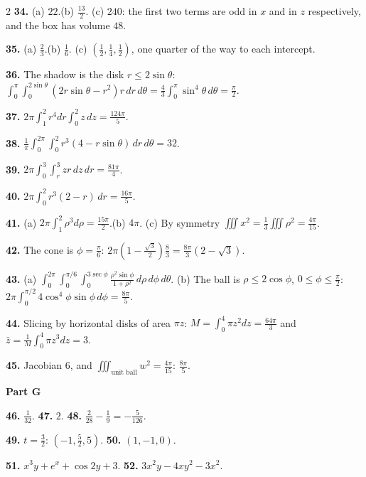 \documentclass[11pt,oneside]{article}
\begin{document}
{\begin{multicols}{2}
\textbf{34.} (a) $22$.\quad (b) $\tfrac{13}{2}$.\quad
(c) $240$: the first two terms are odd in $x$ and in $z$ respectively, and the box has volume $48$.

\textbf{35.} (a) $\tfrac23$.\quad (b) $\tfrac16$.\quad
(c) $\left(\tfrac12,\tfrac14,\tfrac12\right)$, one quarter of the way to each intercept.

\textbf{36.} The shadow is the disk $r\le2\sin\theta$:
$\int_0^{\pi}\!\int_0^{2\sin\theta}\left(2r\sin\theta-r^{2}\right)r\,dr\,d\theta
=\tfrac43\int_0^{\pi}\sin^{4}\theta\,d\theta=\tfrac{\pi}{2}$.

\textbf{37.} $2\pi\int_1^2r^{4}dr\int_0^2z\,dz=\tfrac{124\pi}{5}$.

\textbf{38.} $\tfrac1\pi\int_0^{2\pi}\!\int_0^2r^{3}(4-r\sin\theta)\,dr\,d\theta=32$.

\textbf{39.} $2\pi\int_0^3\!\int_r^3zr\,dz\,dr=\tfrac{81\pi}{4}$.

\textbf{40.} $2\pi\int_0^2r^{3}(2-r)\,dr=\tfrac{16\pi}{5}$.

\textbf{41.} (a) $2\pi\int_1^2\rho^{3}d\rho=\tfrac{15\pi}{2}$.\quad (b) $4\pi$.\quad
(c) By symmetry $\iiint x^{2}=\tfrac13\iiint\rho^{2}=\tfrac{4\pi}{15}$.

\textbf{42.} The cone is $\phi=\tfrac{\pi}{6}$:
$2\pi\left(1-\tfrac{\sqrt3}{2}\right)\tfrac83=\tfrac{8\pi}{3}\left(2-\sqrt3\right)$.

\textbf{43.} (a) $\displaystyle\int_0^{2\pi}\!\!\int_0^{\pi/6}\!\!\int_0^{3\sec\phi}
\frac{\rho^{2}\sin\phi}{1+\rho^{2}}\,d\rho\,d\phi\,d\theta$.\quad
(b) The ball is $\rho\le2\cos\phi$, $0\le\phi\le\tfrac{\pi}{2}$:
$2\pi\int_0^{\pi/2}4\cos^{4}\phi\sin\phi\,d\phi=\tfrac{8\pi}{5}$.

\textbf{44.} Slicing by horizontal disks of area $\pi z$: $M=\int_0^4\pi z^{2}dz=\tfrac{64\pi}{3}$
and $\bar z=\tfrac{1}{M}\int_0^4\pi z^{3}dz=3$.

\textbf{45.} Jacobian $6$, and $\iiint_{\text{unit ball}}w^{2}=\tfrac{4\pi}{15}$:
$\tfrac{8\pi}{5}$.

\vspace{4pt}
\textbf{Part G}\par\vspace{2pt}

\textbf{46.} $\tfrac{1}{32}$.\qquad
\textbf{47.} $2$.\qquad
\textbf{48.} $\tfrac{2}{28}-\tfrac19=-\tfrac{5}{126}$.

\textbf{49.} $t=\tfrac32$: $\left(-1,\tfrac52,5\right)$.\qquad
\textbf{50.} $(1,-1,0)$.

\textbf{51.} $x^{3}y+e^{x}+\cos2y+3$.\qquad
\textbf{52.} $3x^{2}y-4xy^{2}-3x^{2}$.


\end{multicols}}
\end{document}
